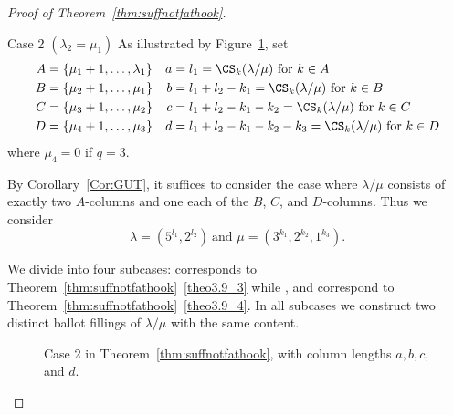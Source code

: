 \begin{proof}[Proof of Theorem~\ref{thm:suffnotfathook}]
\begin{Case}
\end{Case}

\begin{Case}
{Case 2 $(\lambda_2 = \mu_1)$} 
As illustrated by Figure~\ref{case2}, set 
\begin{align*}
A & = \{ \mu_1 + 1,\ldots,\lambda_1 \} & a & = l_1 = \CS _k(\lambda / \mu)\text{ for }k \in A \\
B & = \{ \mu_{2} + 1,\ldots,\mu_{1} \} & b & = l_1+l_2-k_1 = \CS _k(\lambda / \mu)\text{ for }k \in B \\
C & = \{ \mu_{3} + 1,\ldots,\mu_{2} \} & c & = l_1+l_2-k_1-k_2 = \CS _k(\lambda / \mu)\text{ for }k \in C \\
D & = \{ \mu_{4} + 1,\ldots,\mu_{3} \} & d & = l_1+l_2-k_1-k_2-k_3 = \CS _k(\lambda / \mu)\text{ for }k \in D
\end{align*}
where $\mu_{4}=0$ if $q=3$.

By Corollary~\ref{Cor:GUT}, it suffices to consider the case where $\lambda / \mu$ consists of exactly two $A$-columns and one each of the $B$, $C$, and $D$-columns. Thus we consider
\[
\lambda = (5^{l_1},2^{l_2})\ \text{and } \mu = (3^{k_1},2^{k_2},1^{k_3}).
\]

We divide into four subcases:  corresponds to Theorem~\ref{thm:suffnotfathook}~\ref{theo3.9_3} while ,  and  correspond to Theorem~\ref{thm:suffnotfathook}~\ref{theo3.9_4}. In all subcases we construct two distinct ballot fillings of $\lambda/\mu$ with the same content.

\goodbreak
\begin{figure}[htb]\centering
 \caption{Case 2 in Theorem~\ref{thm:suffnotfathook}, with column lengths $a,b,c,$ and $d$.}
 \label{case2} 


\end{figure}
\end{Case}
\end{proof}
